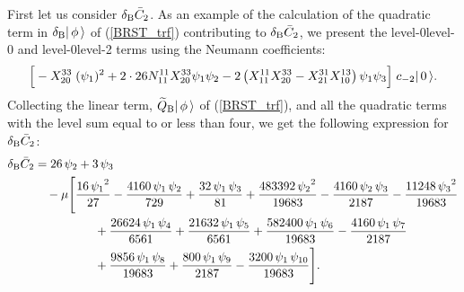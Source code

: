 \documentclass[a4paper,12pt]{article}
\begin{document}
First let us consider $\delta_{\text B}\bar C_2$.
As an example of the calculation of the quadratic term in $\delta_{\text B}
|\, \phi\, \rangle$ of (\ref{BRST_trf}) contributing to  $\delta_{\text B}\bar C_2$,
we present the level-0\tm level-0 and
level-0\tm level-2 terms using the Neumann coefficients:
\begin{align}
  \Big[ -X^{33}_{20} \;(\psi_1)^2  +
   2\cdot 26  N^{11}_{11}X^{33}_{20} \psi_1\psi_2
  -2 \left( X^{11}_{11}X^{33}_{20} - X^{31}_{21}X^{13}_{10}\right)
      \psi_1\psi_3 \Big]\; c_{-2}|\, 0\, \rangle.
\end{align}
Collecting the linear term, $\widetilde Q_{\text B}|\, \phi\, \rangle$ of (\ref{BRST_trf}),
and all the quadratic terms with the level sum equal
to or less than four, we get the following expression for
$\delta_{\text B}\bar C_2$:
\begin{equation}
  \label{BRS_22}
  \begin{split}
   \delta_{\text B} \bar C_2 & = 26\,{\psi_2} + 3\,{\psi_3}  \\
   & \quad - \mu \Biggl[  \frac{16\,{{\psi_1}}^2}{27}
   - \frac{4160\,{\psi_1}\,{\psi_2}}{729}
    + \frac{32\,{\psi_1}\,{\psi_3}}{81}
    + \frac{483392\,{{\psi_2}}^2}{19683}
   - \frac{4160\,{\psi_2}\,{\psi_3}}{2187} -
   \frac{11248\,{{\psi_3}}^2}{19683}\\
   & \hspace*{5em} +
   \frac{26624\,{\psi_1}\,{\psi_4}}{6561} +
   \frac{21632\,{\psi_1}\,{\psi_5}}{6561} +
   \frac{582400\,{\psi_1}\,{\psi_6}}{19683} -
   \frac{4160\,{\psi_1}\,{\psi_7}}{2187}\\
   & \hspace*{5em} + \frac{9856\,{\psi_1}\,{\psi_8}}{19683} +
   \frac{800\,{\psi_1}\,{\psi_9}}{2187}
   - \frac{3200\,{\psi_1}\,{\psi_{10}}}{19683} \Biggr].
  \end{split}
\end{equation}
\end{document}
